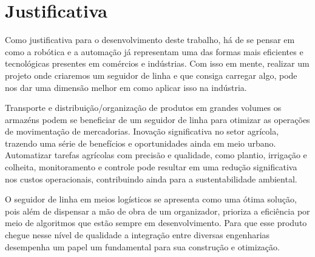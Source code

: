 \section{Justificativa}

Como justificativa para o desenvolvimento deste trabalho, há de se pensar em
como a robótica e a automação já representam uma das formas mais eficientes e
tecnológicas presentes em comércios e indústrias. Com isso em mente, realizar um
projeto onde criaremos um seguidor de linha e que consiga carregar algo, pode
nos dar uma dimensão melhor em como aplicar isso na indústria.

Transporte e distribuição/organização de produtos em grandes volumes os armazéns
podem se beneficiar de um seguidor de linha para otimizar as operações de
movimentação de mercadorias. Inovação significativa no setor agrícola, trazendo
uma série de benefícios e oportunidades ainda em meio urbano. Automatizar
tarefas agrícolas com precisão e qualidade, como plantio, irrigação e colheita,
monitoramento e controle pode resultar em uma redução significativa nos custos
operacionais, contribuindo ainda para a sustentabilidade ambiental.

O seguidor de linha em meios logísticos se apresenta como uma ótima solução,
pois além de dispensar a mão de obra de um organizador, prioriza a eficiência
por meio de algoritmos que estão sempre em desenvolvimento. Para que esse
produto chegue nesse nível de qualidade a integração entre diversas engenharias
desempenha um papel um fundamental para sua construção e otimização.
